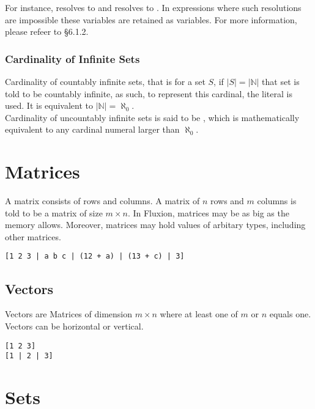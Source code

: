 \documentclass[11pt,a4paper]{book}
\begin{document}
For instance,  resolves to  and  resolves to . In expressions where such resolutions are impossible these variables are retained as variables. For more information, please refeer to \S 6.1.2.

\subsubsection{Cardinality of Infinite Sets}

Cardinality of countably infinite sets, that is for a set $S$, if $|S| = |\mathbb{N}|$ that set is told to be countably infinite, as such, to represent this cardinal, the literal  is used. It is equivalent to $|\mathbb{N}| = \aleph_0$. \\

Cardinality of uncountably infinite sets is said to be , which is mathematically equivalent to any cardinal numeral larger than $\aleph_0$.

\section{Matrices}

A matrix consists of rows and columns. A matrix of $n$ rows and $m$ columns is told to be a matrix of size $m \times n$. In Fluxion, matrices may be as big as the memory allows. Moreover, matrices may hold values of arbitary types, including other matrices.

\begin{lstlisting}[caption={An example matrix},captionpos=b]
[1 2 3 | a b c | (12 + a) | (13 + c) | 3]
\end{lstlisting}

\subsection{Vectors}

Vectors are Matrices of dimension $m \times n$ where at least one of $m$ or $n$ equals one. Vectors can be horizontal or vertical.

\begin{lstlisting}[caption={Example vectors},captionpos=b]
[1 2 3]
[1 | 2 | 3]
\end{lstlisting}

\section{Sets}
\end{document}
